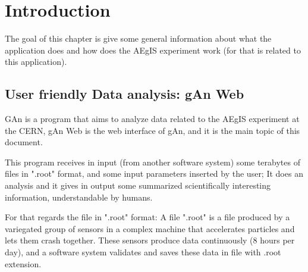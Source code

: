 
\chapter{Introduction} %

\label{Chapter1} %


The goal of this chapter is give some general information about what the application does and how does the AEgIS experiment work (for that is related to this application).

\section{User friendly Data analysis: gAn Web}

GAn is a program that aims to analyze data related to the AEgIS experiment at the CERN, gAn Web is the web interface of gAn, and it is the main topic of this document.
 
This program receives in input (from another software system) some terabytes of files in ".root" format, and some input parameters inserted by the user;
It does an analysis and it gives in output some summarized scientifically interesting information, understandable by humans.   

For that regards the file in ".root" format:
A file ".root" is a file produced by a variegated group of sensors in a complex machine that accelerates particles and lets them crash together. These sensors produce data continuously (8 hours per day), and a software system validates and saves these data in file with .root extension. 

